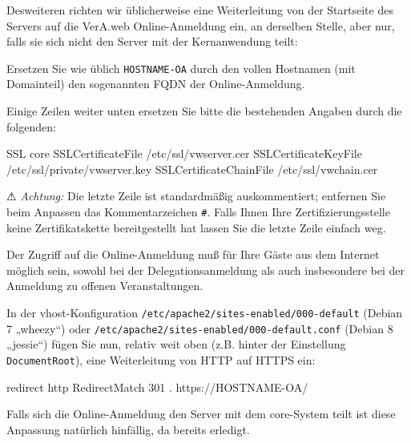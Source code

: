 \begin{minipage}{\textwidth}
Desweiteren richten wir üblicherweise eine Weiterleitung von der
Startseite des Servers auf die VerA.web Online-Anmeldung ein, an
derselben Stelle, aber nur, falls sie sich nicht den Server mit
der Kernanwendung teilt:

\end{minipage}

Ersetzen Sie wie üblich \texttt{HOSTNAME-OA} durch den vollen
Hostnamen (mit Domainteil) \dash den sogenannten FQDN \dash der
Online-Anmeldung.

\begin{minipage}{\textwidth}
Einige Zeilen weiter unten ersetzen Sie bitte die bestehenden
Angaben durch die folgenden:

\begin{lstdump}{SSL core}
SSLCertificateFile /etc/ssl/vwserver.cer
SSLCertificateKeyFile /etc/ssl/private/vwserver.key
SSLCertificateChainFile /etc/ssl/vwchain.cer
\end{lstdump}

⚠ \emph{Achtung:} Die letzte Zeile ist standardmäßig auskommentiert;
entfernen Sie beim Anpassen das Kommentarzeichen \texttt{\#}. Falls
Ihnen Ihre Zertifizierungsstelle keine Zertifikatskette bereitgestellt
hat lassen Sie die letzte Zeile einfach weg.
\end{minipage}

Der Zugriff auf die Online-Anmeldung muß für Ihre Gäste aus dem Internet
möglich sein, sowohl bei der Delegationsanmeldung als auch insbesondere
bei der Anmeldung zu offenen Veranstaltungen.

\begin{minipage}{\textwidth}
In der vhost-Konfiguration \texttt{/etc/apache2/sites-enabled/000-default}
(Debian 7 „wheezy“) oder \texttt{/etc/apache2/sites-enabled/000-default.conf}
(Debian 8 „jessie“) fügen Sie nun, relativ weit oben (z.B. hinter der Einstellung
\texttt{DocumentRoot}), eine Weiterleitung von HTTP auf HTTPS ein:

\begin{lstdump}{redirect http}
RedirectMatch 301 . https://HOSTNAME-OA/
\end{lstdump}
\end{minipage}

Falls sich die Online-Anmeldung den Server mit dem core-System teilt ist
diese Anpassung natürlich hinfällig, da bereits erledigt.

